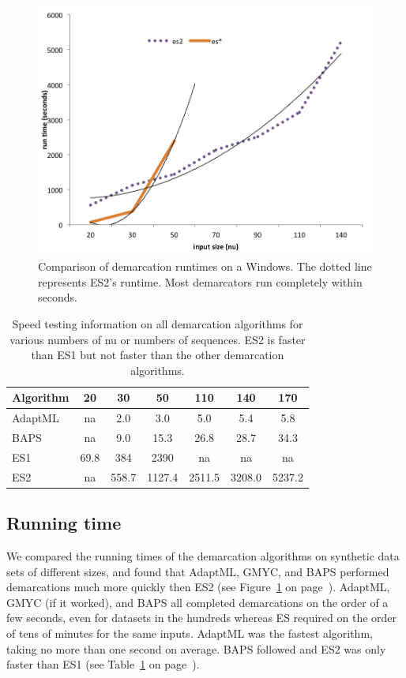 \begin{figure}[h!]
  \centering
    \includegraphics[scale=0.7]{images/SpeedWindows-CH4}
      \caption[Demarcation run time test on Windows.]{Comparison of demarcation runtimes on a Windows. The dotted line represents ES2's runtime. Most demarcators run completely within seconds.}
    \label{fig:WindowsSpeed}
\end{figure}

\begin{table}
\centering
    \begin{tabular}{l|cccccc}
    Algorithm & 20   & 30    & 50     & 110    & 140    & 170    \\ \hline
    AdaptML   & na   & 2.0   & 3.0    & 5.0    & 5.4    & 5.8    \\
    BAPS      & na   & 9.0   & 15.3   & 26.8   & 28.7   & 34.3   \\
    ES1       & 69.8 & 384   & 2390   & na     & na     & na     \\
    ES2       & na   & 558.7 & 1127.4 & 2511.5 & 3208.0 & 5237.2 \\
    \end{tabular}
    \caption[Speed testing information on all demarcation algorithms.]{Speed testing information on all demarcation algorithms for various numbers of nu or numbers of sequences. ES2 is faster than ES1 but not faster than the other demarcation algorithms.}
    \label{tab:WindowsSpeed}
\end{table}

\subsection*{Running time}
We compared the running times of the demarcation algorithms on synthetic data sets of different sizes, and found that AdaptML, GMYC, and BAPS performed demarcations much more quickly then ES2 (see Figure~\ref{fig:WindowsSpeed} on page~\pageref{fig:WindowsSpeed}).
AdaptML, GMYC (if it worked), and BAPS all completed demarcations on the order of a few seconds, even for datasets in the hundreds whereas ES required on the order of tens of minutes for the same inputs.
AdaptML was the fastest algorithm, taking no more than one second on average.
BAPS followed and ES2 was only faster than ES1 (see Table~\ref{tab:WindowsSpeed} on page~\pageref{tab:WindowsSpeed}).


